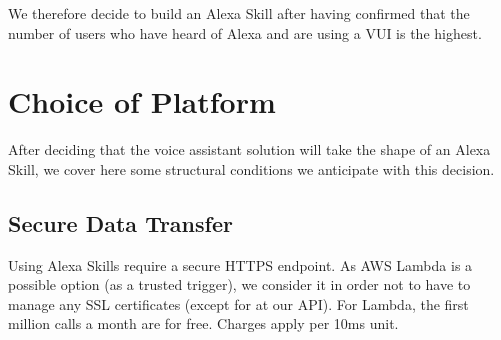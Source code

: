 We therefore decide to build an Alexa Skill after having confirmed that the number of users who have heard of Alexa and are using a VUI is the highest.




%


%
%	
%






%
%
%
%	

\section{Choice of Platform} %
\label{choiceOfPlatform}

After deciding that the voice assistant solution will take the shape of an Alexa Skill, we cover here some structural conditions we anticipate with this decision.

	\subsection*{Secure Data Transfer}
	Using Alexa Skills require a secure HTTPS endpoint. As AWS Lambda is a possible option (as a trusted trigger), we consider it in order not to have to manage any SSL certificates (except for at our API). For Lambda, the first million calls a month are for free. Charges apply per 10ms unit.
	
